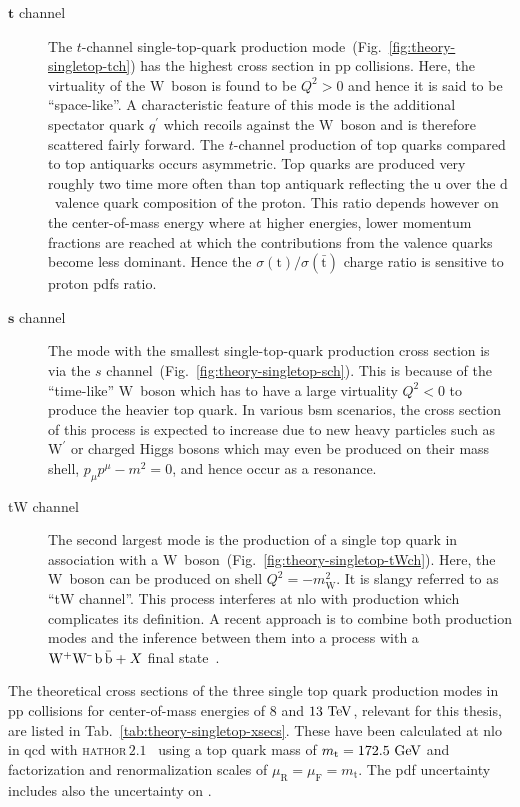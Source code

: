 \begin{description}
\item[$\boldsymbol{t}$ channel] The $t$-channel single-top-quark production mode~(Fig.~\ref{fig:theory-singletop-tch}) has the highest cross section in $\mathrm{pp}$ collisions. Here, the virtuality of the $\mathrm{W}$~boson is found to be $Q^2>0$ and hence it is said to be ``space-like''. A characteristic feature of this mode is the additional spectator quark $q^\prime$ which recoils against the $\mathrm{W}$~boson and is therefore scattered fairly forward. The $t$-channel production of top quarks compared to top antiquarks occurs asymmetric. Top quarks are produced very roughly two time more often than top antiquark reflecting the $\mathrm{u}$ over the $\mathrm{d}$~valence quark composition of the proton. This ratio depends however on the center-of-mass energy where at higher energies, lower momentum fractions are reached at which the contributions from the valence quarks become less dominant. Hence the $\sigma(\mathrm{t})/\sigma(\bar{\mathrm{t}})$ charge ratio is sensitive to proton \glspl{pdf} ratio.
\item[$\boldsymbol{s}$ channel] The mode with the smallest single-top-quark production cross section is via the $s$ channel~(Fig.~\ref{fig:theory-singletop-sch}). This is because of the ``time-like'' $\mathrm{W}$~boson which has to have a large virtuality $Q^2<0$ to produce the heavier top quark. In various \gls{bsm} scenarios, the cross section of this process is expected to increase due to new heavy particles such as $\mathrm{W}^\prime$ or charged Higgs bosons which may even be produced on their mass shell, $p_{\mu}p^{\mu}-m^{2}=0$, and hence occur as a resonance.
\item[tW channel] The second largest mode is the production of a single top quark in association with a $\mathrm{W}$~boson~(Fig.~\ref{fig:theory-singletop-tWch}). Here, the $\mathrm{W}$~boson can be produced on shell $Q^2=-m_\mathrm{W}^{2}$. It is slangy referred to as ``tW channel''. This process interferes at \gls{nlo} with \ttbar production which complicates its definition. A recent approach is to combine both production modes and the inference between them into a process with a $\mathrm{W}^{\rmplus}\mathrm{W}^{\rmminus}\,\mathrm{b}\,\bar{\mathrm{b}}+X$ final state~\cite{Cascioli:2013wga}. 
\end{description}

The theoretical cross sections of the three single top quark production modes in pp collisions for center-of-mass energies of $8$ and $13~\mathrm{TeV}$, relevant for this thesis, are listed in Tab.~\ref{tab:theory-singletop-xsecs}. These have been calculated at \gls{nlo} in \gls{qcd} with \textsc{\gls{hathor}}\,$2.1$~\cite{Aliev:2010zk,Kant:2014oha} using a top quark mass of $m_\mathrm{t}=172.5~\mathrm{GeV}$ and factorization and renormalization scales of $\mu_\mathrm{R}=\mu_\mathrm{F}=m_\mathrm{t}$. The \gls{pdf} uncertainty includes also the uncertainty on \as.

